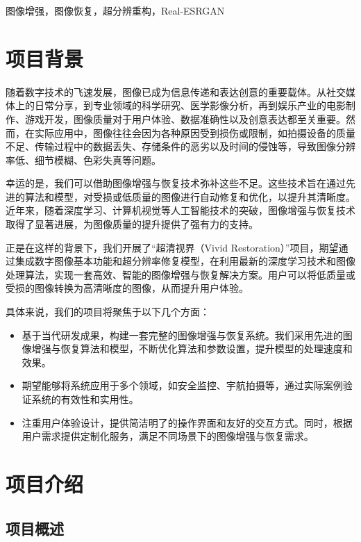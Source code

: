 \documentclass[UTF8,openany]{ctexbook}
\begin{document}
\bigskip

图像增强，图像恢复，超分辨重构，Real-ESRGAN
\songti

\newpage
\chapter{项目背景}

随着数字技术的飞速发展，图像已成为信息传递和表达创意的重要载体。从社交媒体上的日常分享，到专业领域的科学研究、医学影像分析，再到娱乐产业的电影制作、游戏开发，图像质量对于用户体验、数据准确性以及创意表达都至关重要。然而，在实际应用中，图像往往会因为各种原因受到损伤或限制，如拍摄设备的质量不足、传输过程中的数据丢失、存储条件的恶劣以及时间的侵蚀等，导致图像分辨率低、细节模糊、色彩失真等问题。

幸运的是，我们可以借助图像增强与恢复技术弥补这些不足。这些技术旨在通过先进的算法和模型，对受损或低质量的图像进行自动修复和优化，以提升其清晰度。近年来，随着深度学习、计算机视觉等人工智能技术的突破，图像增强与恢复技术取得了显著进展，为图像质量的提升提供了强有力的支持。

正是在这样的背景下，我们开展了“超清视界（Vivid Restoration）”项目，期望通过集成数字图像基本功能和超分辨率修复模型，在利用最新的深度学习技术和图像处理算法，实现一套高效、智能的图像增强与恢复解决方案。用户可以将低质量或受损的图像转换为高清晰度的图像，从而提升用户体验。

具体来说，我们的项目将聚焦于以下几个方面：

\begin{itemize}
  \item 基于当代研发成果，构建一套完整的图像增强与恢复系统。我们采用先进的图像增强与恢复算法和模型，不断优化算法和参数设置，提升模型的处理速度和效果。

  \item 期望能够将系统应用于多个领域，如安全监控、宇航拍摄等，通过实际案例验证系统的有效性和实用性。
  
  \item 注重用户体验设计，提供简洁明了的操作界面和友好的交互方式。同时，根据用户需求提供定制化服务，满足不同场景下的图像增强与恢复需求。
\end{itemize}

\newpage

\chapter{项目介绍}

\section{项目概述}
\end{document}
